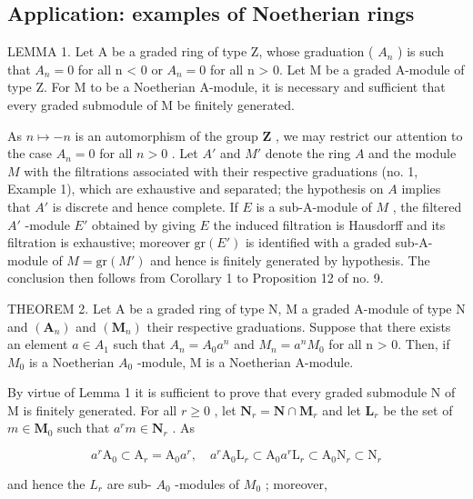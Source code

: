 \subsection{Application: examples of Noetherian rings}

LEMMA 1. Let A be a graded ring of type Z, whose graduation ( \(A_{n}\) ) is such that \(A_{n} = 0\) for all n \textless{} 0 or \(A_{n} = 0\) for all n \textgreater{} 0. Let M be a graded A-module of type Z. For M to be a Noetherian A-module, it is necessary and sufficient that every graded submodule of M be finitely generated.

As \(n \mapsto -n\) is an automorphism of the group \(\mathbf{Z}\) , we may restrict our attention to the case \(A_n = 0\) for all \(n > 0\) . Let \(A'\) and \(M'\) denote the ring \(A\) and the module \(M\) with the filtrations associated with their respective graduations (no. 1, Example 1), which are exhaustive and separated; the hypothesis on \(A\) implies that \(A'\) is discrete and hence complete. If \(E\) is a sub-A-module of \(M\) , the filtered \(A'\) -module \(E'\) obtained by giving \(E\) the induced filtration is Hausdorff and its filtration is exhaustive; moreover \(\text{gr}(E')\) is identified with a graded sub-A-module of \(M = \text{gr}(M')\) and hence is finitely generated by hypothesis. The conclusion then follows from Corollary 1 to Proposition 12 of no. 9.

THEOREM 2. Let A be a graded ring of type N, M a graded A-module of type N and \((\mathbf{A}_{n})\) and \((\mathbf{M}_{n})\) their respective graduations. Suppose that there exists an element \(a \in A_{1}\) such that \(A_{n} = A_{0}a^{n}\) and \(M_{n} = a^{n}M_{0}\) for all n \textgreater{} 0. Then, if \(M_{0}\) is a Noetherian \(A_{0}\) -module, M is a Noetherian A-module.

By virtue of Lemma 1 it is sufficient to prove that every graded submodule N of M is finitely generated. For all \(r \geqslant 0\) , let \(\mathbf{N}_r = \mathbf{N} \cap \mathbf{M}_r\) and let \(\mathbf{L}_r\) be the set of \(m \in \mathbf{M}_0\) such that \(a^r m \in \mathbf{N}_r\) . As

\[
a ^ {r} \mathrm{A} _ {0} \subset \mathrm{A} _ {r} = \mathrm{A} _ {0} a ^ {r}, \quad a ^ {r} \mathrm{A} _ {0} \mathrm{L} _ {r} \subset \mathrm{A} _ {0} a ^ {r} \mathrm{L} _ {r} \subset \mathrm{A} _ {0} \mathrm{N} _ {r} \subset \mathrm{N} _ {r}
\]

and hence the \(L_{r}\) are sub- \(A_{0}\) -modules of \(M_{0}\) ; moreover,

